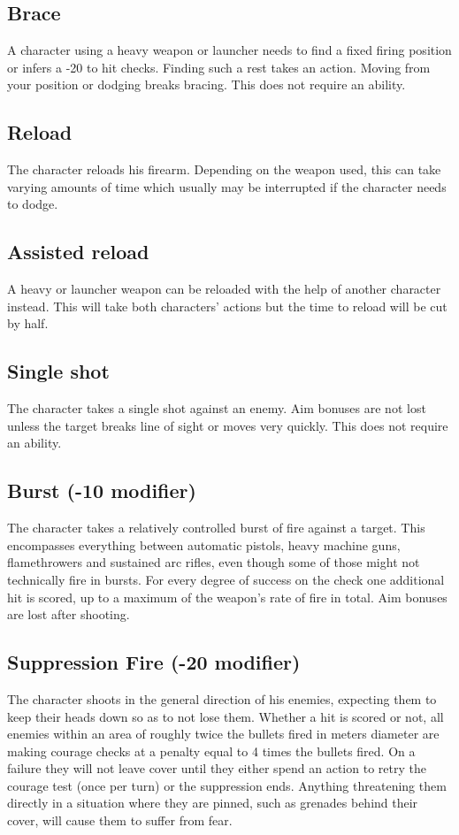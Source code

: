 \documentclass[12pt,a4paper,openany]{book}
\begin{document}
	\subsection*{Brace}
	A character using a heavy weapon or launcher needs to find a fixed firing position or infers a -20 to hit checks. Finding such a rest takes an action. Moving from your position or dodging breaks bracing. This does not require an ability.
	\subsection*{Reload}
	The character reloads his firearm. Depending on the weapon used, this can take varying amounts of time which usually may be interrupted if the character needs to dodge.
	\subsection*{Assisted reload}
	A heavy or launcher weapon can be reloaded with the help of another character instead. This will take both characters’ actions but the time to reload will be cut by half.
	\subsection*{Single shot}
	The character takes a single shot against an enemy. Aim bonuses are not lost unless the target breaks line of sight or moves very quickly. This does not require an ability.
	\subsection*{Burst (-10 modifier)}
	The character takes a relatively controlled burst of fire against a target. This encompasses everything between automatic pistols, heavy machine guns, flamethrowers and sustained arc rifles, even though some of those might not technically fire in bursts. For every degree of success on the check one additional hit is scored, up to a maximum of the weapon’s rate of fire in total. Aim bonuses are lost after shooting.
	\subsection*{Suppression Fire (-20 modifier)}
	The character shoots in the general direction of his enemies, expecting them to keep their heads down so as to not lose them. Whether a hit is scored or not, all enemies within an area of roughly twice the bullets fired in meters diameter are making courage checks at a penalty equal to 4 times the bullets fired. On a failure they will not leave cover until they either spend an action to retry the courage test (once per turn) or the suppression ends. Anything threatening them directly in a situation where they are pinned, such as grenades behind their cover, will cause them to suffer from fear.
\end{document}
